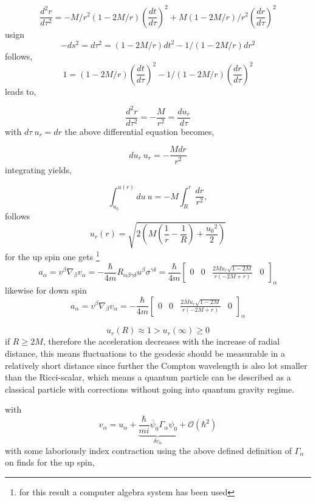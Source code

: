 \documentclass[12pt,a4paper]{article}
\begin{document}
	$$
	\frac{d^2 r}{d \tau^2} = -M /r^2 (1-2M/r) \left(\frac{dt}{d\tau}\right)^2 + M (1-2M/r)/r^2 \left(\frac{dr}{d \tau}\right)^2
	$$
	usign $$-ds^2 = d\tau^2 = \left(1- 2M/r\right)dt^2 - 1/(1-2M/r)dr^2$$
	follows,
	$$
	1 = (1-2M/r)\left(\frac{dt}{d\tau}\right)^2 - 1/(1-2M/r)\left(\frac{dr}{d\tau}\right)^2
	$$
	leads to,
	
	$$
	\frac{d^2r}{d\tau^2} = - \frac{M}{r^2} = \frac{d u_r}{d\tau}
	$$
	with $d\tau \  u_r = d r$ the above differential equation becomes,
	
	$$
	du_r \ u_r = -\frac{M dr}{r^2}
	$$
	integrating yields,
	
	$$
	\int_{u_0}^{u(r)} du \ u = - M \int _R^r \frac{dr}{r^2},
	$$
	follows
	$$
	u_r(r) = \sqrt{2\left(M\left(\frac{1}{r}-\frac{1}{R}\right) + \frac{{u_0}^2}{2} \right)}
	$$
	for the up spin one gets \footnote{for this result a computer algebra system has been used}
	\begin{equation}
		a_\alpha = v^\beta \nabla_\beta v_\alpha =  -\frac{\hbar}{4m} R_{\alpha \beta \gamma \delta}u^\beta \sigma^{\gamma \delta} = \frac{\hbar}{4m} \left[\begin{matrix}0 & 0 & \frac{2 M u_{r} \sqrt{1 - 2 M}}{r \left(- 2 M + r\right)} & 0\end{matrix}\right]_\alpha
	\end{equation}
	likewise for down spin
	\begin{equation}
		a_\alpha = v^\beta \nabla_\beta v_\alpha = -\frac{\hbar}{4m} \left[\begin{matrix}0 & 0 & \frac{2 M u_{r} \sqrt{1 - 2 M}}{r \left(- 2 M + r\right)} & 0\end{matrix}\right]_\alpha
	\end{equation}
	
	$$
	u_r(R) \approx 1 > u_r(\infty) \geq 0 
	$$
	if $R\geq 2M$, 
	therefore the acceleration decreases with the increase of radial distance, this means fluctuations to the geodesic should be measurable in a relatively short distance since further the Compton wavelength is also lot smaller than the Ricci-scalar, which means a quantum particle can be described as a classical particle with corrections without going into quantum gravity regime. 
	
	with 
	\begin{equation}
		\label{correction_to_v}
		v_\alpha = u_\alpha + \underbrace{\frac{\hbar}{mi}\overbar{\psi}_0 \Gamma_\alpha \psi_0}_{\delta v_\alpha} +\mathcal{O} (\hbar^2)
	\end{equation}
	with some laboriously index contraction using the above defined definition of $\Gamma_\alpha$
	on finds for the up spin,
	
\end{document}
